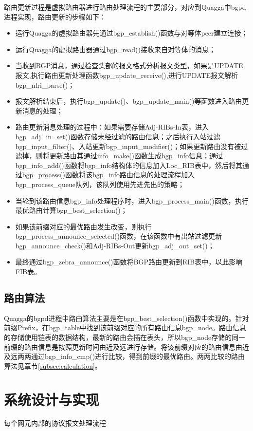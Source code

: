 路由更新过程是虚拟路由器进行路由处理流程的主要部分，对应到Quagga中bgpd进程实现，路由更新的步骤如下：
\begin{itemize}
  \item 运行Quagga的虚拟路由器先通过bgp\_establish()函数与对等体peer建立连接；
  \item 运行Quagga的虚拟路由器通过bgp\_read()接收来自对等体的消息；
  \item 当收到BGP消息，通过检查头部的报文格式分析报文类型，如果是UPDATE报文,执行路由更新处理函数bgp\_update\_receive(),进行UPDATE报文解析bgp\_nlri\_parse()；
  \item 报文解析结束后，执行bgp\_update()、bgp\_update\_main()等函数进入路由更新消息的处理；
  \item 路由更新消息处理的过程中：如果需要存储Adj-RIBs-In表，进入bgp\_adj\_in\_set()函数存储未经过滤的路由信息；之后执行入站过滤bgp\_input\_filter()、入站更新bgp\_input\_modifier()；如果更新路由没有被过滤掉，则将更新路由其通过info\_make()函数生成bgp\_info信息；通过bgp\_info\_add()函数将bgp\_info结构体的信息加入Loc\_RIB表中，然后将其通过bgp\_process()函数将该bgp\_info路由信息的处理流程加入bgp\_process\_queue队列，该队列使用先进先出的策略；
  \item 当轮到该路由信息bgp\_info处理程序时，进入bgp\_process\_main()函数，执行最优路由计算bgp\_best\_selection()；
  \item 如果该前缀对应的最优路由发生改变，则执行bgp\_process\_announce\_selected()函数，在该函数中有出站过滤更新bgp\_announce\_check()和Adj-RIBs-Out更新bgp\_adj\_out\_set()；
  \item 最终通过bgp\_zebra\_announce()函数将BGP路由更新到RIB表中，以此影响FIB表。
\end{itemize}

\subsection{路由算法}

Quagga的bgpd进程中路由算法主要是在bgp\_best\_selection()函数中实现的。针对前缀Prefix，在bgp\_table中找到该前缀对应的所有路由信息bgp\_node。路由信息的存储使用链表的数据结构，最新的路由会插在表头，所以bgp\_node存储的同一前缀的路由信息是按照更新时间由近及远进行存储。将该前缀对应的路由信息由近及远两两通过bgp\_info\_cmp()进行比较，得到前缀的最优路由。两两比较的路由算法见章节\ref{subsec:calculation}。


\section{系统设计与实现}
每个网元内部的协议报文处理流程


